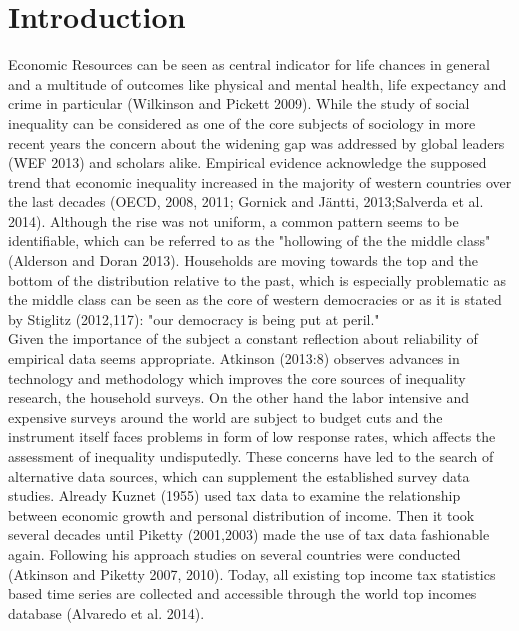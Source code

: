 
\section{Introduction}



Economic Resources can be seen as central indicator for life chances in general and a multitude of outcomes like physical and mental health, life expectancy and crime in particular (Wilkinson and Pickett 2009). While the study of social inequality can be considered as one of the core subjects of sociology in more recent years the concern about the widening gap was addressed by global leaders (WEF 2013) and scholars alike. Empirical evidence acknowledge the supposed trend that economic inequality increased in the majority of western countries over the last decades (OECD, 2008, 2011; Gornick and Jäntti, 2013;Salverda et al. 2014). Although the rise was not uniform, a common pattern seems to be identifiable, which can be referred to as the "hollowing of the the middle class" (Alderson and Doran 2013). Households are moving towards the top and the bottom of the distribution relative to the past, which is especially problematic as the middle class can be seen as the core of western democracies or as it is stated by Stiglitz (2012,117): "our democracy is being put at peril."
\\


Given the importance of the subject a constant reflection about reliability of empirical data seems appropriate. Atkinson (2013:8) observes advances in technology and methodology which improves the core sources of inequality research, the household surveys.  On the other hand the labor intensive and expensive surveys around the world are subject to budget cuts and the instrument itself faces problems in form of low response rates, which affects the assessment of inequality undisputedly. These concerns have led to the search of alternative data sources, which can supplement the established survey data studies. Already Kuznet (1955) used tax data to examine the relationship between economic growth and personal distribution of income. Then it took several decades until Piketty (2001,2003) made the use of tax data fashionable again. Following his approach studies on several countries were conducted (Atkinson and Piketty 2007, 2010). Today, all existing top income tax statistics based time series are collected and accessible through the world top incomes database (Alvaredo et al. 2014). \\

